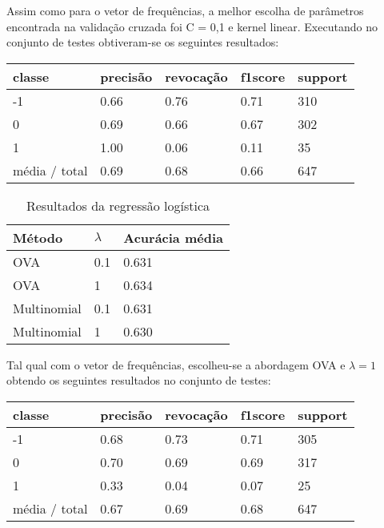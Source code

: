 Assim como para o vetor de frequências, a melhor escolha de parâmetros encontrada na validação
cruzada foi C = 0,1 e kernel linear. Executando no conjunto de testes obtiveram-se os seguintes
resultados:

\begin{table}[H]
	\centering
		\begin{tabular}{l | l | l | l | l}
		\hline
		classe  	&	precisão  &  revocação &  f1\-score &  support \\
		\hline
         -1    &   0.66   &   0.76  &    0.71    &   310 \\
         \hline
          0     &  0.69   &   0.66   &   0.67    &   302 \\
         \hline
          1     &  1.00  &    0.06   &   0.11    &    35 \\
		\hline
		média / total    &   0.69   &   0.68   &   0.66    &   647 \\
		\hline
	\end{tabular}
\end{table}

\begin{table}[H]
	\centering
	\caption{Resultados da regressão logística}
	\begin{tabular}{l l l}
		\hline
		Método & $\lambda$ & Acurácia média \\
		\hline
		OVA & 0.1 & 0.631 \\
		\hline
		OVA & 1 & 0.634 \\
		\hline
		Multinomial & 0.1 & 0.631 \\
		\hline
		Multinomial & 1 & 0.630 \\
		\hline
	\end{tabular}
\end{table}

Tal qual com o vetor de frequências, escolheu-se a abordagem OVA e $\lambda = 1$ obtendo os seguintes
resultados no conjunto de testes:

\begin{table}[H]
	\centering
		\begin{tabular}{l | l | l | l | l}
		\hline
		classe  	&	precisão  &  revocação &  f1\-score &  support \\
		\hline
		 -1    &   0.68   &   0.73  &    0.71   &    305 \\
		 \hline
          0    &   0.70   &   0.69   &   0.69   &    317 \\
          \hline
          1   &    0.33   &   0.04   &   0.07   &     25 \\
		 \hline
		média / total    &   0.67   &   0.69  &    0.68   &    647 \\
		\hline
	\end{tabular}
\end{table}

